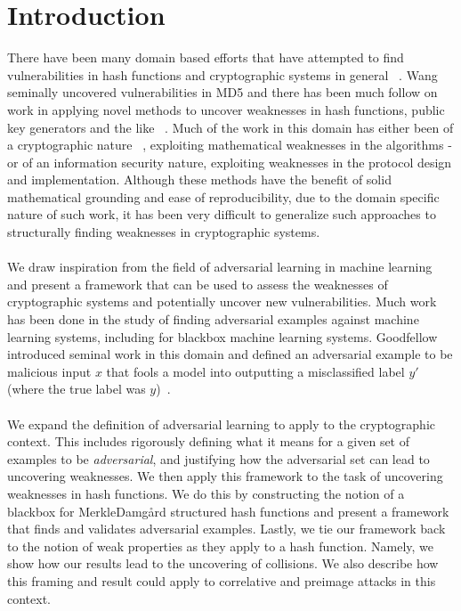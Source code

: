 \documentclass[letterpaper,twocolumn,10pt]{article}
\begin{document}
\section{Introduction}
There have been many domain based efforts that have attempted to find vulnerabilities in hash functions and cryptographic systems in general ~\cite{wang2005efficient, den1993collisions, heninger2009reconstructing, stevens2012attacks,  den1991attack, kelsey1998cryptanalytic}. Wang seminally uncovered vulnerabilities in MD5 and there has been much follow on work in applying novel methods to uncover weaknesses in hash functions, public key generators and the like ~\cite{wang2005break, gutterman2006analysis, yilek2009private}. Much of the work in this domain has either been of a cryptographic nature ~\cite{wang2005cryptanalysis}, exploiting mathematical weaknesses in the algorithms - or of an information security nature, exploiting weaknesses in the protocol design and implementation. Although these methods have the benefit of solid mathematical grounding and ease of reproducibility, due to the domain specific nature of such work, it has been very difficult to generalize such approaches to structurally finding weaknesses in cryptographic systems. 
\\
\\
We draw inspiration from the field of adversarial learning in machine learning and present a framework that can be used to assess the weaknesses of cryptographic systems and potentially uncover new vulnerabilities. Much work has been done in the study of finding adversarial examples against machine learning systems, including for blackbox machine learning systems. Goodfellow introduced seminal work in this domain and defined an adversarial example to be malicious input $x$ that fools a model into outputting a misclassified label $y'$ (where the true label was $y$)~\cite{goodfellow2014generative, kurakin2016adversarial}. 
\\
\\
We expand the definition of adversarial learning to apply to the cryptographic context. This includes rigorously defining what it means for a given set of examples to be \emph{adversarial}, and justifying how the adversarial set can lead to uncovering weaknesses. We then apply this framework to the task of uncovering weaknesses in hash functions. We do this by constructing the notion of a blackbox for Merkle{\textendash}Damg\r{a}rd structured hash functions and present a framework that finds and validates adversarial examples. Lastly, we tie our framework back to the notion of weak properties as they apply to a hash function. Namely, we show how our results lead to the uncovering of collisions. We also describe how this framing and result could apply to correlative and preimage attacks in this context.\\
\end{document}

